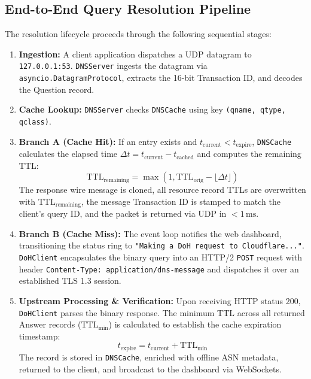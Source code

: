\documentclass[10pt,a4paper]{article}
\begin{document}
\subsection{End-to-End Query Resolution Pipeline}
The resolution lifecycle proceeds through the following sequential stages:
\begin{enumerate}\itemsep 1pt
    \item \textbf{Ingestion:} A client application dispatches a UDP datagram to \texttt{127.0.0.1:53}. \texttt{DNSServer} ingests the datagram via \texttt{asyncio.DatagramProtocol}, extracts the 16-bit Transaction ID, and decodes the Question record.
    \item \textbf{Cache Lookup:} \texttt{DNSServer} checks \texttt{DNSCache} using key \texttt{(qname, qtype, qclass)}.
    \item \textbf{Branch A (Cache Hit):} If an entry exists and $t_{\text{current}} < t_{\text{expire}}$, \texttt{DNSCache} calculates the elapsed time $\Delta t = t_{\text{current}} - t_{\text{cached}}$ and computes the remaining TTL:
    \begin{equation}
        \text{TTL}_{\text{remaining}} = \max\left(1, \text{TTL}_{\text{orig}} - \lfloor \Delta t \rfloor\right)
    \end{equation}
    The response wire message is cloned, all resource record TTLs are overwritten with $\text{TTL}_{\text{remaining}}$, the message Transaction ID is stamped to match the client's query ID, and the packet is returned via UDP in $< 1\,\text{ms}$.
    \item \textbf{Branch B (Cache Miss):} The event loop notifies the web dashboard, transitioning the status ring to \texttt{"Making a DoH request to Cloudflare..."}. \texttt{DoHClient} encapsulates the binary query into an HTTP/2 \texttt{POST} request with header \texttt{Content-Type: application/dns-message} and dispatches it over an established TLS 1.3 session.
    \item \textbf{Upstream Processing \& Verification:} Upon receiving HTTP status 200, \texttt{DoHClient} parses the binary response. The minimum TTL across all returned Answer records ($\text{TTL}_{\min}$) is calculated to establish the cache expiration timestamp:
    \begin{equation}
        t_{\text{expire}} = t_{\text{current}} + \text{TTL}_{\min}
    \end{equation}
    The record is stored in \texttt{DNSCache}, enriched with offline ASN metadata, returned to the client, and broadcast to the dashboard via WebSockets.
\end{enumerate}
\end{document}
